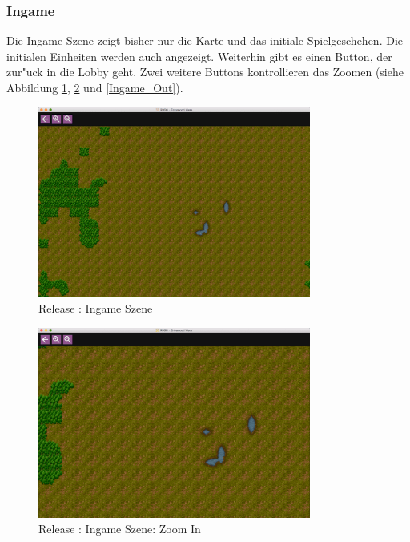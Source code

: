 \documentclass[12pt, titlepage]{scrartcl}
\newcommand{\RN}[1]{%
	\textup{\uppercase\expandafter{\romannumeral#1}}%
}
\begin{document}
	        \subsubsection{Ingame}
	            Die Ingame Szene zeigt bisher nur die Karte und das initiale Spielgeschehen. Die initialen Einheiten werden auch angezeigt. Weiterhin gibt es einen Button, der zur"uck in die Lobby geht. Zwei weitere Buttons kontrollieren das Zoomen (siehe Abbildung \ref{Ingame}, \ref{Ingame_In} und \ref{Ingame_Out}). \\
	            \begin{figure}[H] 
    				\centering
    				\includegraphics[width=0.8\textwidth]{images/old_state/ingame/Ingame.png}
    				\caption{Release \RN{2}: Ingame Szene}
    				\label{Ingame}
			    \end{figure}
			    \begin{figure}[H] 
    				\centering
    				\includegraphics[width=0.8\textwidth]{images/old_state/ingame/ZoomIn.png}
    				\caption{Release \RN{2}: Ingame Szene: Zoom In}
    				\label{Ingame_In}
			    \end{figure}
\end{document}

